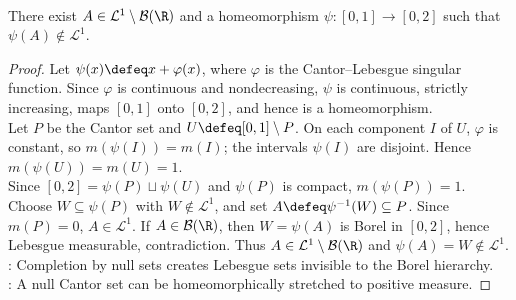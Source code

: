 \begin{theorem} \label{thm:lebesgue-measurable-non-borel-set-exists} \\
There exist $A\in\mathcal{L}^1\setminus\mathcal{B}(\R)$ and a homeomorphism $\psi:[0,1]\to[0,2]$ such that $\psi(A)\notin\mathcal{L}^1$.
\begin{proof} Let $\psi(x)\defeq x+\varphi(x)$, where $\varphi$ is the Cantor--Lebesgue singular function. Since $\varphi$ is continuous and nondecreasing, $\psi$ is continuous, strictly increasing, maps $[0,1]$ onto $[0,2]$, and hence is a homeomorphism.\\
Let $P$ be the Cantor set and $U\defeq[0,1]\setminus P$. On each component $I$ of $U$, $\varphi$ is constant, so $m(\psi(I))=m(I)$; the intervals $\psi(I)$ are disjoint. Hence $m(\psi(U))=m(U)=1$.\\
Since $[0,2]=\psi(P)\sqcup\psi(U)$ and $\psi(P)$ is compact, $m(\psi(P))=1$. Choose $W\subseteq\psi(P)$ with $W\notin\mathcal{L}^1$, and set $A\defeq\psi^{-1}(W)\subseteq P$. Since $m(P)=0$, $A\in\mathcal{L}^1$. If $A\in\mathcal{B}(\R)$, then $W=\psi(A)$ is Borel in $[0,2]$, hence Lebesgue measurable, contradiction. Thus $A\in\mathcal{L}^1\setminus\mathcal{B}(\R)$ and $\psi(A)=W\notin\mathcal{L}^1$.\\
: Completion by null sets creates Lebesgue sets invisible to the Borel hierarchy.\\
: A null Cantor set can be homeomorphically stretched to positive measure.
\end{proof}
\end{theorem}
